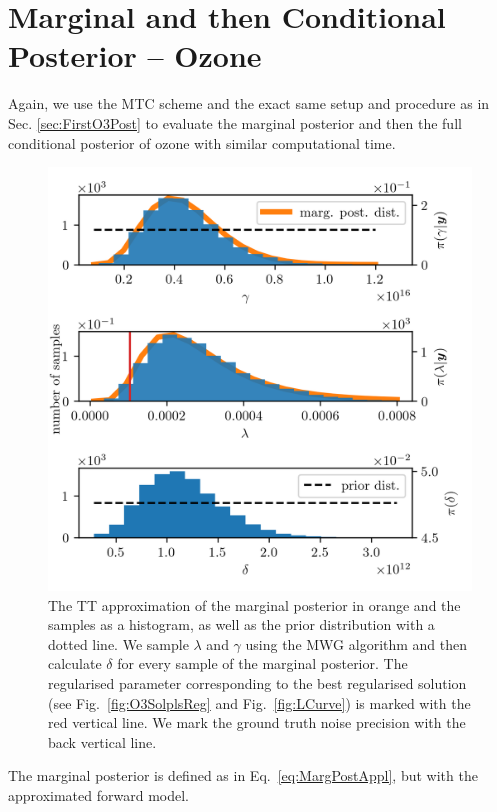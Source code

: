 \section{Marginal and then Conditional Posterior -- Ozone}

Again, we use the MTC scheme and the exact same setup and procedure as in Sec. \ref{sec:FirstO3Post} to evaluate the marginal posterior and then the full conditional posterior of ozone with similar computational time.

\begin{figure}[ht!]
	\centering
	\includegraphics{secMargO3Res.png}
	\caption[Marginal posterior histograms and TT approximation as well as hyper-prior distribution.]{The TT approximation of the marginal posterior in orange and the samples as a histogram, as well as the prior distribution with a dotted line. We sample $\lambda$ and $\gamma$ using the MWG algorithm and then calculate $\delta$ for every sample of the marginal posterior. The regularised parameter corresponding to the best regularised solution (see Fig.~\ref{fig:O3SolplsReg} and Fig.~\ref{fig:LCurve}) is marked with the red vertical line. We mark the ground truth noise precision with the back vertical line.}
	\label{fig:MargPostHistTT}
\end{figure}
The marginal posterior is defined as in Eq.~\ref{eq:MargPostAppl}, but with the approximated forward model.
